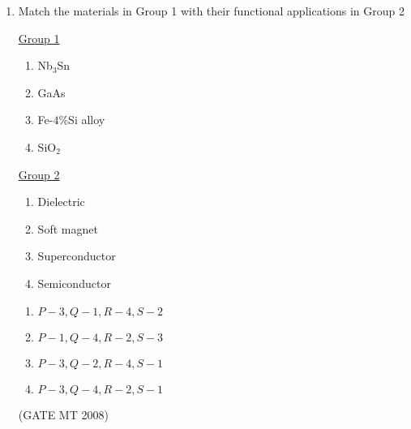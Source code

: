 \documentclass[11pt, letterpaper]{article}
\theoremstyle{remark}
\begin{document}
\begin{enumerate}[label=Q.\arabic*]
\item Match the materials in Group 1 with their functional applications in Group 2
\begin{multicols}{2}
    \underline{Group 1}
    \begin{enumerate}[label=(\Alph*), start=16]
        \item Nb$_3$Sn
        \item GaAs 
        \item Fe-$4$\%Si alloy
        \item SiO$_2$
    \end{enumerate}

     \underline{Group 2}
    \begin{enumerate}[label=(\arabic*), start=1]
        \item Dielectric
        \item Soft magnet
        \item Superconductor  
        \item Semiconductor
    \end{enumerate}
\end{multicols}
\vspace{-2em} 
    \begin{multicols}{2}
        \begin{enumerate}[label=(\MakeUppercase{\alph*})]
            \item $P-3, Q-1, R-4, S-2$
            \item $P-1, Q-4, R-2, S-3$
            \item $P-3, Q-2, R-4, S-1$
            \item $P-3, Q-4, R-2, S-1$
        \end{enumerate}
    \end{multicols}
 \hfill(GATE MT 2008) 
    

\end{enumerate}
\end{document}
